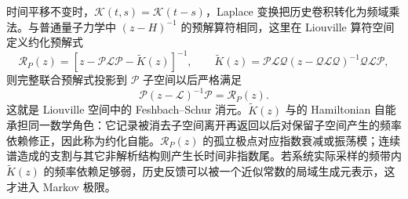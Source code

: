 时间平移不变时，$\mathcal K(t,s)=\mathcal K(t-s)$，Laplace 变换把历史卷积转化为频域乘法。与普通量子力学中 $(z-H)^{-1}$ 的预解算符相同，这里在 Liouville 算符空间定义约化预解式
\begin{equation}
\boxed{
\mathcal R_P(z)
=\left[z-\mathcal P\mathcal L\mathcal P-\widetilde K(z)\right]^{-1},
\qquad
\widetilde K(z)
=\mathcal P\mathcal L\mathcal Q
(z-\mathcal Q\mathcal L\mathcal Q)^{-1}
\mathcal Q\mathcal L\mathcal P,}
\label{eq:nz_reduced_resolvent_definition}
\end{equation}
则完整联合预解式投影到 $\mathcal P$ 子空间以后严格满足
\begin{equation}
\boxed{
\mathcal P(z-\mathcal L)^{-1}\mathcal P
=\mathcal R_P(z).}
\label{eq:nz_projected_full_resolvent_schur_identity}
\end{equation}
这就是 Liouville 空间中的 Feshbach--Schur 消元。$\widetilde K(z)$ 与的 Hamiltonian 自能承担同一数学角色：它记录被消去子空间离开再返回以后对保留子空间产生的频率依赖修正，因此称为约化自能。$\mathcal R_P(z)$ 的孤立极点对应指数衰减或振荡模；连续谱造成的支割与其它非解析结构则产生长时间非指数尾。若系统实际采样的频带内 $\widetilde K(z)$ 的频率依赖足够弱，历史反馈可以被一个近似常数的局域生成元表示，这才进入 Markov 极限。

